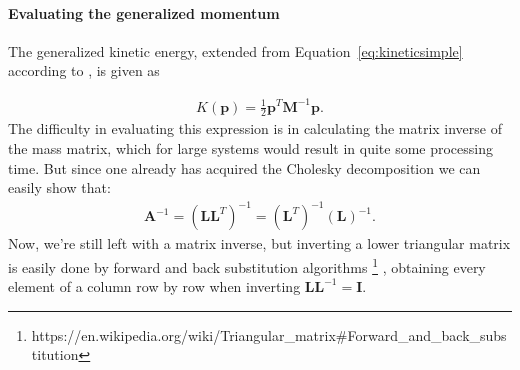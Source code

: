 \paragraph{Evaluating the generalized momentum}
The generalized kinetic energy, extended from Equation~\ref{eq:kineticsimple} according to \cite{neal2011mcmc}, is given as

\begin{gather}
	K(\mathbf{p}) = \frac{1}{2} \mathbf{p}^T \mathbf{M}^{-1} \mathbf{p}.
\end{gather}
The difficulty in evaluating this expression is in calculating the matrix inverse of the mass matrix, which for large systems would result in quite some processing time. But since one already has acquired the Cholesky decomposition we can easily show that:
\begin{gather}
	\mathbf{A} ^{-1} = \left( \mathbf{L} \mathbf{L}^T \right)^{-1} = \left(\mathbf{L}^T\right)^{-1} \left( \mathbf{L} \right) ^{-1}.
\end{gather}
Now, we're still left with a matrix inverse, but inverting a lower triangular matrix is easily done by forward and back substitution algorithms
\footnote{https://en.wikipedia.org/wiki/Triangular\_matrix\#Forward\_and\_back\_substitution}
, obtaining every element of a column row by row when inverting $\mathbf{L} \mathbf{L}^{-1} = \mathbf{I}$.






